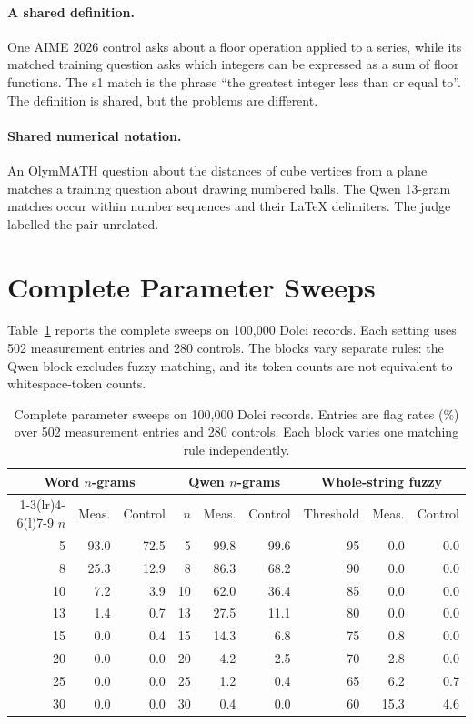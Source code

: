 \documentclass[11pt]{article}
\begin{document}
\paragraph{A shared definition.}
One AIME 2026 control asks about a floor operation applied to a series, while its matched training question asks which integers can be expressed as a sum of floor functions. The s1 match is the phrase ``the greatest integer less than or equal to''. The definition is shared, but the problems are different.

\paragraph{Shared numerical notation.}
An OlymMATH question about the distances of cube vertices from a plane matches a training question about drawing numbered balls. The Qwen 13-gram matches occur within number sequences and their \LaTeX{} delimiters. The judge labelled the pair unrelated.

\section{Complete Parameter Sweeps}
\label{app:tuning}

Table~\ref{tab:threshold-sweep} reports the complete sweeps on 100,000 Dolci records. Each setting uses 502 measurement entries and 280 controls. The blocks vary separate rules: the Qwen block excludes fuzzy matching, and its token counts are not equivalent to whitespace-token counts.

\begin{table}[!t]
\centering
\small
\setlength{\tabcolsep}{6pt}
\begin{tabular}{@{}rrr rrr rrr@{}}
\toprule
\multicolumn{3}{c}{Word $n$-grams} & \multicolumn{3}{c}{Qwen $n$-grams} & \multicolumn{3}{c}{Whole-string fuzzy} \\
\cmidrule(lr){1-3}\cmidrule(lr){4-6}\cmidrule(l){7-9}
$n$ & Meas. & Control & $n$ & Meas. & Control & Threshold & Meas. & Control \\
\midrule
5  & 93.0 & 72.5 & 5  & 99.8 & 99.6 & 95 & 0.0  & 0.0 \\
8  & 25.3 & 12.9 & 8  & 86.3 & 68.2 & 90 & 0.0  & 0.0 \\
10 & 7.2  & 3.9  & 10 & 62.0 & 36.4 & 85 & 0.0  & 0.0 \\
13 & 1.4  & 0.7  & 13 & 27.5 & 11.1 & 80 & 0.0  & 0.0 \\
15 & 0.0  & 0.4  & 15 & 14.3 & 6.8  & 75 & 0.8  & 0.0 \\
20 & 0.0  & 0.0  & 20 & 4.2  & 2.5  & 70 & 2.8  & 0.0 \\
25 & 0.0  & 0.0  & 25 & 1.2  & 0.4  & 65 & 6.2  & 0.7 \\
30 & 0.0  & 0.0  & 30 & 0.4  & 0.0  & 60 & 15.3 & 4.6 \\
\bottomrule
\end{tabular}
\caption{Complete parameter sweeps on 100,000 Dolci records. Entries are flag rates (\%) over 502 measurement entries and 280 controls. Each block varies one matching rule independently.}
\label{tab:threshold-sweep}
\end{table}
\end{document}
